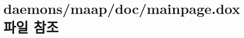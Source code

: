 \hypertarget{maap_2doc_2mainpage_8dox}{}\section{daemons/maap/doc/mainpage.dox 파일 참조}
\label{maap_2doc_2mainpage_8dox}
